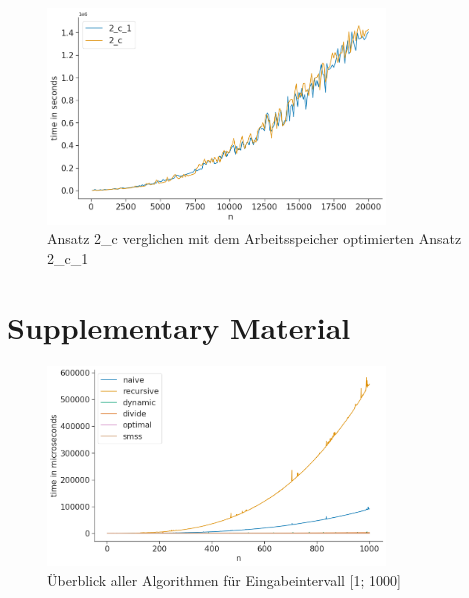 \documentclass[10pt]{article}
\begin{document}
\begin{figure}[t]
    \centering
    \includegraphics[width=0.8\textwidth]{../times_2c_20000.png}
    \caption{Ansatz 2\_c verglichen mit dem Arbeitsspeicher optimierten Ansatz 2\_c\_1}
    \label{fig:time_comp_2c}
\end{figure}

\section{Supplementary Material}


\begin{figure}[ht]
    \centering
    \includegraphics[width=0.8\textwidth]{../times_1000_all.png}
    \caption{Überblick aller Algorithmen für Eingabeintervall [1; 1000]}
    \label{fig:overview}
\end{figure}
\end{document}
